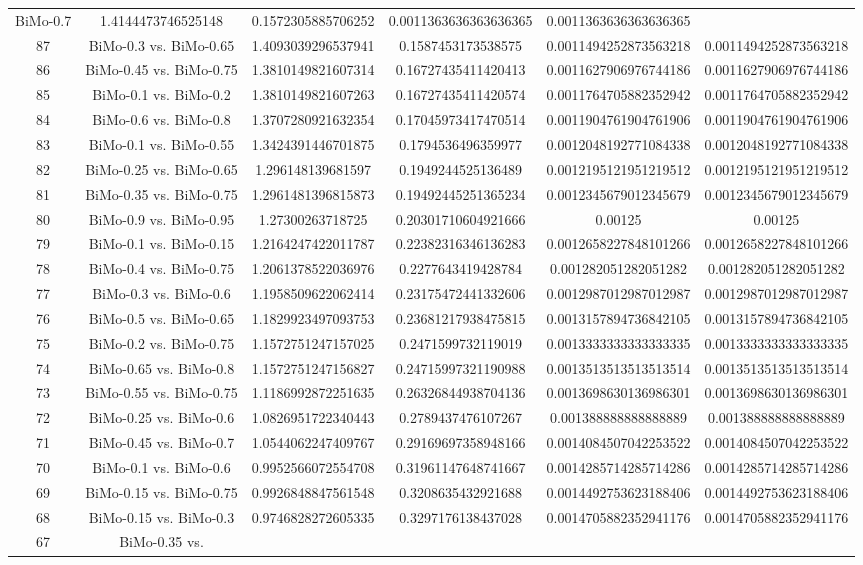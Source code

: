 \documentclass[a4paper,10pt]{article}
\begin{document}
\begin{landscape}
\begin{table}[!htp]
\begin{tabular}{cccccc}
BiMo-0.7&1.4144473746525148&0.1572305885706252&0.0011363636363636365&0.0011363636363636365\\87&BiMo-0.3 vs. BiMo-0.65&1.4093039296537941&0.1587453173538575&0.0011494252873563218&0.0011494252873563218\\86&BiMo-0.45 vs. BiMo-0.75&1.3810149821607314&0.16727435411420413&0.0011627906976744186&0.0011627906976744186\\85&BiMo-0.1 vs. BiMo-0.2&1.3810149821607263&0.16727435411420574&0.0011764705882352942&0.0011764705882352942\\84&BiMo-0.6 vs. BiMo-0.8&1.3707280921632354&0.17045973417470514&0.0011904761904761906&0.0011904761904761906\\83&BiMo-0.1 vs. BiMo-0.55&1.3424391446701875&0.1794536496359977&0.0012048192771084338&0.0012048192771084338\\82&BiMo-0.25 vs. BiMo-0.65&1.296148139681597&0.1949244525136489&0.0012195121951219512&0.0012195121951219512\\81&BiMo-0.35 vs. BiMo-0.75&1.2961481396815873&0.19492445251365234&0.0012345679012345679&0.0012345679012345679\\80&BiMo-0.9 vs. BiMo-0.95&1.27300263718725&0.20301710604921666&0.00125&0.00125\\79&BiMo-0.1 vs. BiMo-0.15&1.2164247422011787&0.22382316346136283&0.0012658227848101266&0.0012658227848101266\\78&BiMo-0.4 vs. BiMo-0.75&1.2061378522036976&0.2277643419428784&0.001282051282051282&0.001282051282051282\\77&BiMo-0.3 vs. BiMo-0.6&1.1958509622062414&0.23175472441332606&0.0012987012987012987&0.0012987012987012987\\76&BiMo-0.5 vs. BiMo-0.65&1.1829923497093753&0.23681217938475815&0.0013157894736842105&0.0013157894736842105\\75&BiMo-0.2 vs. BiMo-0.75&1.1572751247157025&0.2471599732119019&0.0013333333333333335&0.0013333333333333335\\74&BiMo-0.65 vs. BiMo-0.8&1.1572751247156827&0.24715997321190988&0.0013513513513513514&0.0013513513513513514\\73&BiMo-0.55 vs. BiMo-0.75&1.1186992872251635&0.26326844938704136&0.0013698630136986301&0.0013698630136986301\\72&BiMo-0.25 vs. BiMo-0.6&1.0826951722340443&0.2789437476107267&0.001388888888888889&0.001388888888888889\\71&BiMo-0.45 vs. BiMo-0.7&1.0544062247409767&0.29169697358948166&0.0014084507042253522&0.0014084507042253522\\70&BiMo-0.1 vs. BiMo-0.6&0.9952566072554708&0.31961147648741667&0.0014285714285714286&0.0014285714285714286\\69&BiMo-0.15 vs. BiMo-0.75&0.9926848847561548&0.3208635432921688&0.0014492753623188406&0.0014492753623188406\\68&BiMo-0.15 vs. BiMo-0.3&0.9746828272605335&0.3297176138437028&0.0014705882352941176&0.0014705882352941176\\67&BiMo-0.35 vs. 
\end{tabular}
\end{table}
\end{landscape}
\end{document}
